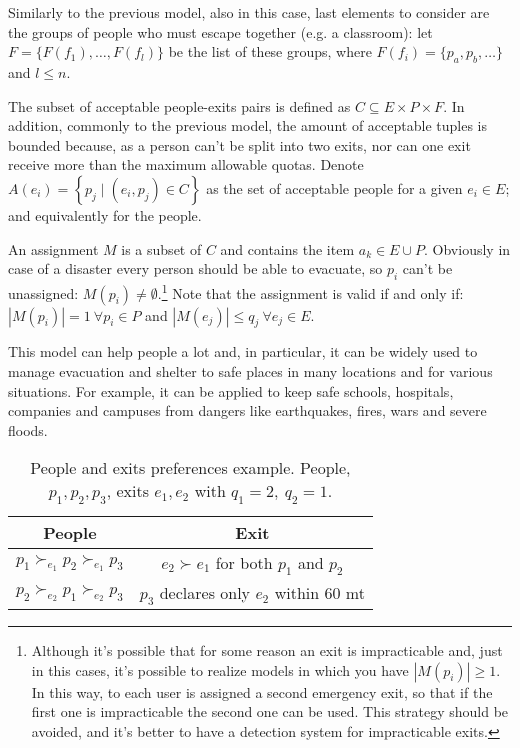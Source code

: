 Similarly to the previous model, also in this case, last elements to consider are the groups of people who must escape together (e.g. a classroom): let \(F=\{F(f_1), \dots, F(f_l)\}\) be the list of these groups, where \(F(f_i) = \{p_a, p_b, \dots\}\) and \(l\leq n\).

The subset of acceptable people-exits pairs is defined as \(C \subseteq E \times P \times F\). In addition, commonly to the previous model, the amount of acceptable tuples is bounded because, as a person can't be split into two exits, nor can one exit receive more than the maximum allowable quotas. Denote \( A \left( e_i \right) = \left\{ p_j \mid \left( e_i , p_j \right) \in C \right\} \) as the set of acceptable people for a given \( e_i \in E \); and equivalently for the people.

An assignment \(M\) is a subset of \(C\) and contains the item \( a_k \in E \cup P \). Obviously in case of a disaster every person should be able to evacuate, so  \( p_i\) can't be unassigned: \( M \left( p_i\right) \neq \emptyset \).\footnote{Although it's possible that for some reason an exit is impracticable and, just in this cases, it's possible to realize models in which you have \(|M \left( p_i \right)| \geq 1\). In this way, to each user is assigned a second emergency exit, so that if the first one is impracticable the second one can be used. This strategy should be avoided, and it's better to have a detection system for impracticable exits.}
Note that the assignment is valid if and only if: \(\left| M \left( p_i\right) \right| = 1 \ \forall p_i\in P\) and \(\left| M \left( e_j \right) \right| \leq q_j \ \forall e_j \in E\).

This model can help people a lot and, in particular, it can be widely used to manage evacuation and shelter to safe places in many locations and for various situations. For example, it can be applied to keep safe schools, hospitals, companies and campuses from dangers like earthquakes, fires, wars and severe floods.

\begin{table}[!htb]
    \centering
    \begin{tabular}{c|c}
        \hline People & Exit \\
        \hline \(p_1 \succ_{e_1} p_2 \succ_{e_1} p_3\) & \(e_2 \succ e_1\) for both \(p_1\) and \(p_2\) \\
        \(p_2 \succ_{e_2} p_1 \succ_{e_2} p_3\) & \(p_3\) declares only \(e_2\) within 60 mt \\
        \hline
    \end{tabular}
    \caption{People and exits preferences example. People, \(p_1, p_2, p_3\), exits \(e_1, e_2\) with \( q_1 = 2, \ q_2 = 1\).}
    \label{tab:people-exit}
\end{table}
